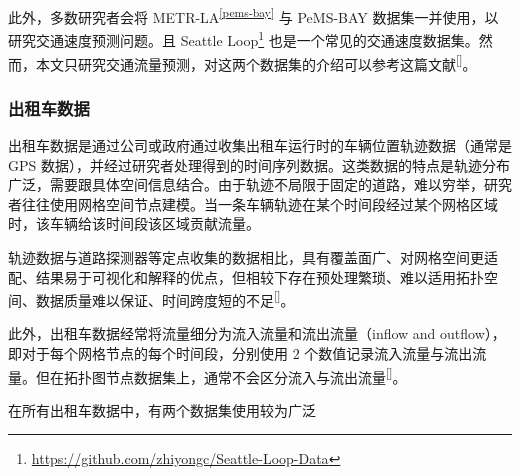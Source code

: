 \documentclass{ctexart}
\renewcommand{\cite}[1]{\textsuperscript{[\citenum{#1}]}}
\begin{document}
此外，多数研究者会将 METR-LA\textsuperscript{\ref{pems-bay}} 与 PeMS-BAY 数据集一并使用，以研究交通速度预测问题。且 Seattle Loop\footnote{\url{https://github.com/zhiyongc/Seattle-Loop-Data}} 也是一个常见的交通速度数据集。然而，本文只研究交通流量预测，对这两个数据集的介绍可以参考这篇文献\cite{T-ZS2}。

\subsubsection{出租车数据}\label{subsubsection:taxidata}

出租车数据是通过公司或政府通过收集出租车运行时的车辆位置轨迹数据（通常是 GPS 数据），并经过研究者处理得到的时间序列数据。这类数据的特点是轨迹分布广泛，需要跟具体空间信息结合。由于轨迹不局限于固定的道路，难以穷举，研究者往往使用网格空间节点建模。当一条车辆轨迹在某个时间段经过某个网格区域时，该车辆给该时间段该区域贡献流量。

轨迹数据与道路探测器等定点收集的数据相比，具有覆盖面广、对网格空间更适配、结果易于可视化和解释的优点，但相较下存在预处理繁琐、难以适用拓扑空间、数据质量难以保证、时间跨度短的不足\cite{T-ZS1}。

此外，出租车数据经常将流量细分为流入流量和流出流量（inflow and outflow），即对于每个网格节点的每个时间段，分别使用 $2$ 个数值记录流入流量与流出流量。但在拓扑图节点数据集上，通常不会区分流入与流出流量\cite{T-ZS45}。

在所有出租车数据中，有两个数据集使用较为广泛
\end{document}
